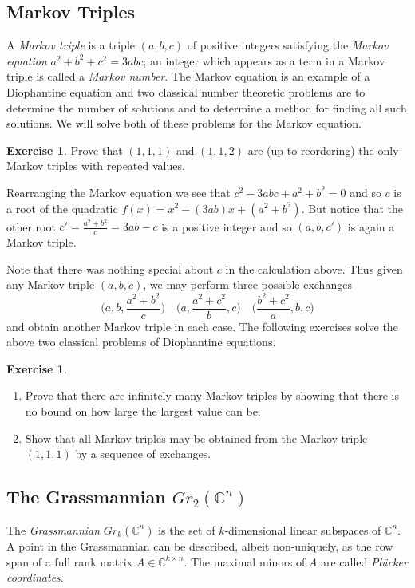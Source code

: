 \documentclass{amsart}
\theoremstyle{definition}
\newtheorem{example}[theorem]{Example}
\newtheorem{exercise}[theorem]{Exercise}
\theoremstyle{remark}
\numberwithin{equation}{section}
\newcommand{\CC}{{\mathbb{C}}}
\begin{document}
	\subsection{Markov Triples} \label{sub:Markov triples}
    A \emph{Markov triple} is a triple $(a,b,c)$ of positive integers satisfying the \emph{Markov equation} $a^2+b^2+c^2=3abc$; an integer which appears as a term in a Markov triple is called a \emph{Markov number}.  The Markov equation is an example of a Diophantine equation and two classical number theoretic problems are to determine the number of solutions and to determine a method for finding all such solutions.  We will solve both of these problems for the Markov equation.
    
    \begin{exercise}
      Prove that $(1,1,1)$ and $(1,1,2)$ are (up to reordering) the only Markov triples with repeated values.
    \end{exercise}
    Rearranging the Markov equation we see that $c^2-3abc+a^2+b^2=0$ and so $c$ is a root of the quadratic $f(x)=x^2-(3ab)x+(a^2+b^2)$.  But notice that the other root $c'=\frac{a^2+b^2}{c}=3ab-c$ is a positive integer and so $(a,b,c')$ is again a Markov triple.  

    Note that there was nothing special about $c$ in the calculation above.  Thus given any Markov triple $(a,b,c)$, we may perform three possible exchanges 
    \[\Big(a,b,\frac{a^2+b^2}{c}\Big)\quad\Big(a,\frac{a^2+c^2}{b},c\Big)\quad\Big(\frac{b^2+c^2}{a},b,c\Big)\]
    and obtain another Markov triple in each case.  The following exercises solve the above two classical problems of Diophantine equations.
    \begin{exercise}\mbox{}
      \begin{enumerate}
        \item Prove that there are infinitely many Markov triples by showing that there is no bound on how large the largest value can be.
        \item Show that all Markov triples may be obtained from the Markov triple $(1,1,1)$ by a sequence of exchanges.
      \end{enumerate}
    \end{exercise}

	\subsection{The Grassmannian $Gr_{2}(\CC^n)$} \label{sub:Gr2n}
		The \emph{Grassmannian} $Gr_{k}(\CC^n)$ is the set of $k$-dimensional linear subspaces of $\CC^n$.  A point in the Grassmannian can be described, albeit non-uniquely, as the row span of a full rank matrix $A \in \CC^{k \times n}$.  The maximal minors of $A$ are called \emph{Pl\"ucker coordinates}.
		
\end{document}
